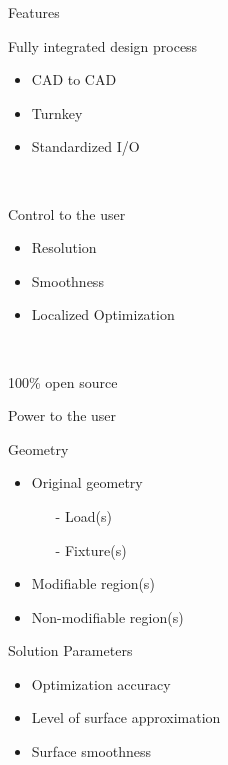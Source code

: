 \begin{frame}{Features}
	
	\begin{block}{Fully integrated design process}{
			\begin{itemize}		
				\item CAD to CAD
				\item Turnkey
				\item Standardized I/O			
			\end{itemize}~\\
		}
	\end{block}
	\begin{block}{Control to the user}{
			\begin{itemize}		
				\item Resolution
				\item Smoothness
				\item Localized Optimization			
			\end{itemize}~\\
		}
	\end{block}	
	\begin{block}{100\% open source}{
		}
	\end{block}
	
\end{frame}

\begin{frame} {Power to the user}
	
	\begin{block} {Geometry} {
			\begin{itemize}
				\item Original geometry
				\begin{itemize}
					\item[-] Load(s)
					\item[-] Fixture(s)
				\end{itemize}
				\item Modifiable region(s)
				\item Non-modifiable region(s)
			\end{itemize}
			}
	\end{block}
	\pause
	
	\begin{block} {Solution Parameters} {
			\begin{itemize}
				\item Optimization accuracy
				\item Level of surface approximation
				\item Surface smoothness
			\end{itemize}
			}
	\end{block}
		
\end{frame}

